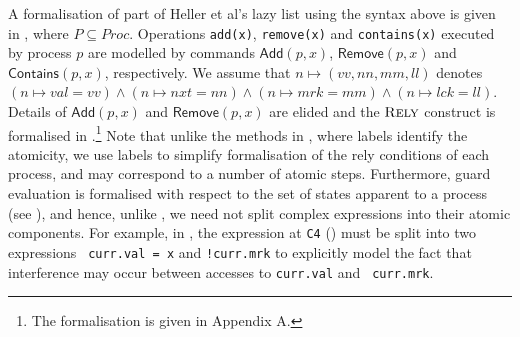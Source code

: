 \documentclass{article}
\def \rely {\mathop{\textsc{Rely}}}
\theoremstyle{plain}
\theoremstyle{definition}
\begin{document}
A formalisation of part of Heller et al's lazy list using the syntax
above is given in , where $P \subseteq
Proc$. Operations {\tt add(x)}, {\tt remove(x)} and {\tt contains(x)}
executed by process $p$ are modelled by commands $\mathsf{Add}(p,x)$,
$\mathsf{Remove}(p,x)$ and $\mathsf{Contains}(p,x)$, respectively. We
assume that $n \longmapsto (vv, nn, mm, ll)$ denotes $(n \mapsto val =
vv) \land (n \mapsto nxt = nn) \land (n \mapsto mrk = mm) \land (n
\mapsto lck = ll)$. Details of $\mathsf{Add}(p,x)$ and
$\mathsf{Remove}(p,x)$ are elided and the $\rely$ construct is
formalised in .\footnote{The
  formalisation is given in Appendix A.}  Note that unlike the methods
in \cite{CGLM06,DSW11}, where labels identify the atomicity, we use
labels to simplify formalisation of the rely conditions of each
process, and may correspond to a number of atomic steps.
Furthermore, guard evaluation is formalised with respect to the set of states
apparent to a process (see ), and hence,
unlike \cite{VHHS06,CGLM06,DSW11}, we need not split complex
expressions into their atomic components. For example, in \cite{VHHS06,CGLM06,DSW11}, the expression at {\tt C4}
() must be split into two expressions {\tt
  curr.val = x} and {\tt !curr.mrk} to explicitly model the fact that
interference may occur between accesses to {\tt curr.val} and {\tt
  curr.mrk}. 
\end{document}
